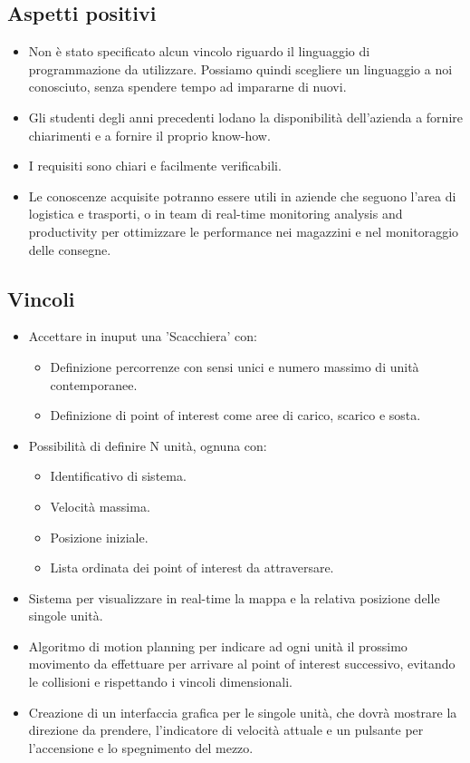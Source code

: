 \subsection{Aspetti positivi}
\begin{itemize}
\item Non è stato specificato alcun vincolo riguardo il linguaggio di programmazione da utilizzare. Possiamo quindi scegliere un linguaggio a noi conosciuto, senza spendere tempo ad impararne di nuovi.
\item Gli studenti degli anni precedenti lodano la disponibilità dell'azienda a fornire chiarimenti e a fornire il proprio know-how.
\item I requisiti sono chiari e facilmente verificabili.
\item Le conoscenze acquisite potranno essere utili in aziende che seguono l'area di logistica e trasporti, o in team di real-time monitoring analysis and productivity per ottimizzare le performance nei magazzini e nel monitoraggio delle consegne.
\end{itemize}

\subsection{Vincoli}
\begin{itemize}
\item Accettare in inuput una 'Scacchiera' con:
\begin{itemize}
	\item Definizione percorrenze con sensi unici e numero massimo di unità contemporanee.
	\item Definizione di point of interest come aree di carico, scarico e sosta.
\end{itemize}
\item Possibilità di definire N unità, ognuna con:
\begin{itemize}
	\item Identificativo di sistema.
	\item Velocità massima.
	\item Posizione iniziale.
	\item Lista ordinata dei point of interest da attraversare.
\end{itemize}
\item Sistema per visualizzare in real-time la mappa e la relativa posizione delle singole unità.
\item Algoritmo di motion planning per indicare ad ogni unità il prossimo movimento da effettuare per arrivare al point of interest successivo, evitando le collisioni e rispettando i vincoli dimensionali.
\item Creazione di un interfaccia grafica per le singole unità, che dovrà mostrare la direzione da prendere, l'indicatore di velocità attuale e un pulsante per l'accensione e lo spegnimento del mezzo.
\end{itemize}


